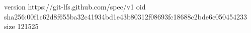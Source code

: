 version https://git-lfs.github.com/spec/v1
oid sha256:00f1c62d8f655ba32c41934bd1e43b80312f08693fc18688c2bde6c050454233
size 121525
